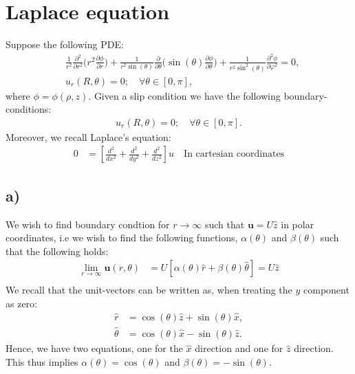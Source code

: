 \documentclass{article}
\begin{document}
\section*{Laplace equation}
Suppose the following PDE:
\begin{align}
    &\frac{1}{r^2}\frac{\partial^2}{\partial r^2}\Big(r^2\frac{\partial \phi}{\partial r}\Big) + \frac{1}{r^2\sin(\theta)}\frac{\partial}{\partial \theta}\Big(\sin(\theta)\frac{\partial \phi}{\partial \theta}\Big) + \frac{1}{r^2\sin^2(\theta)}\frac{\partial^2\phi}{\partial \varphi^2}=0,\label{eq: 2.1}\\
    &u_r(R, \theta) = 0; \quad \forall\theta\in[0,\pi],\nonumber
\end{align} where $\phi= \phi(\rho, z)$. Given a slip condition we have the following boundary-conditions:
\begin{align*}
    u_r(R, \theta) =0;\quad \forall\theta\in[0,\pi].
\end{align*}Moreover, we recall Laplace's equation:
\begin{align*}
    0 &=\left[\frac{d^2}{dx^2} + \frac{d^2}{dy^2}+\frac{d^2}{dz^2}\right]u\quad \text{In cartesian coordinates}
\end{align*}
\subsection*{a)}
We wish to find boundary condtion for $r\to \infty$ such that $\mathbf{u} = U\hat{z}$ in polar coordinates, i.e we wish to find the following functions, $\alpha(\theta)$ and $\beta(\theta)$ such that the following holds:
\begin{align*}
    \lim_{r\to\infty}\mathbf{u}(r, \theta) &= U\left[\alpha(\theta)\hat{r} + \beta(\theta)\hat{\theta}\right] = U\hat{z}\\
\end{align*}We recall that the unit-vectors can be written as, when treating the $y$ component as zero:
\begin{align*}
   \hat{r} &= \cos(\theta)\hat{z} + \sin(\theta)\hat{x},\\
   \hat{\theta} &= \cos(\theta)\hat{x}-\sin(\theta)\hat{z}.
\end{align*}Hence, we have two equations, one for the $\hat{x}$ direction and one for $\hat{z}$ direction. This thus implies $\alpha(\theta) = \cos(\theta)$ and $\beta(\theta) = -\sin(\theta)$.
\end{document}
